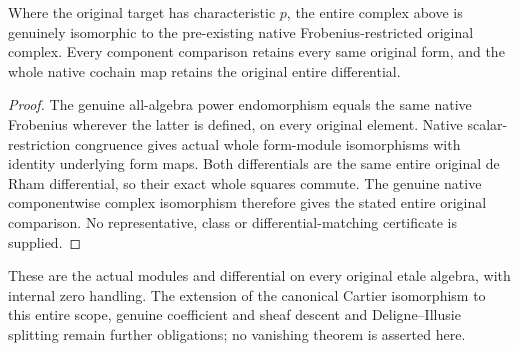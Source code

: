 \begin{theorem}
\label{lem:cartier-original-algebra-zero-native-complex-comparison}
\leanok
Where the original target has characteristic $p$, the entire complex
above is genuinely isomorphic to the pre-existing native
Frobenius-restricted original complex. Every component comparison
retains every same original form, and the whole native cochain map
retains the original entire differential.
\end{theorem}
\begin{proof}
The genuine all-algebra power endomorphism equals the same native
Frobenius wherever the latter is defined, on every original element.
Native scalar-restriction congruence gives actual whole form-module
isomorphisms with identity underlying form maps. Both differentials
are the same entire original de Rham differential, so their exact
whole squares commute. The genuine native componentwise complex
isomorphism therefore gives the stated entire original comparison.
No representative, class or differential-matching certificate is
supplied.
\end{proof}

These are the actual modules and differential on every original
etale algebra, with internal zero handling. The extension of the
canonical Cartier isomorphism to this entire scope, genuine
coefficient and sheaf descent and Deligne--Illusie splitting remain
further obligations; no vanishing theorem is asserted here.
